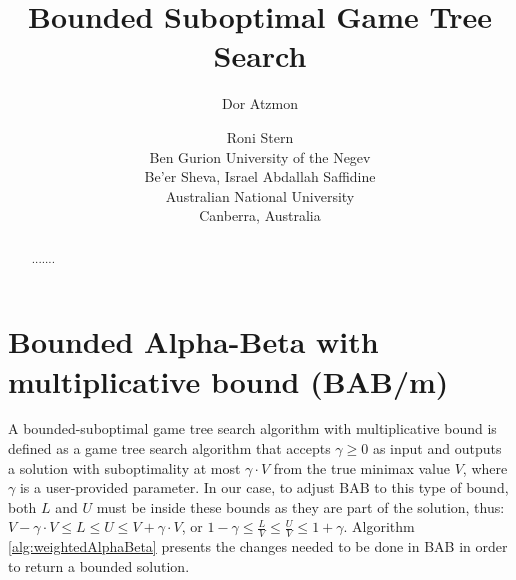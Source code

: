 \documentclass[letterpaper]{article} %
\newcounter{bab}
\newcommand{\MM}{\mathit{V}}
\newcommand{\pess}{\mathit{L}}
\newcommand{\opti}{\mathit{U}}
\begin{document}
\title{Bounded Suboptimal Game Tree Search}
\author{Dor Atzmon \and Roni Stern\\
Ben Gurion University of the Negev\\
Be'er Sheva, Israel
\And
Abdallah Saffidine \\
Australian National University\\
Canberra, Australia}

\maketitle

\begin{abstract}
.......
\end{abstract}



\section{Bounded Alpha-Beta with multiplicative bound (BAB/m)}

A bounded-suboptimal game tree search algorithm with multiplicative bound is defined as a game tree search algorithm that accepts $\gamma \geq 0$ as input and outputs a solution with suboptimality at most $\gamma \cdot \MM$ from the true minimax value $\MM$, where $\gamma$ is a user-provided parameter. In our case, to adjust BAB to this type of bound, both $\pess$ and $\opti$ must be inside these bounds as they are part of the solution, thus: $\MM - \gamma \cdot \MM \leq \pess \leq \opti \leq \MM + \gamma \cdot \MM$, or $1 - \gamma \leq \frac{\pess}{\MM} \leq \frac{\opti}{\MM} \leq 1 + \gamma$.
Algorithm \ref{alg:weightedAlphaBeta} presents the changes needed to be done in BAB in order to return a bounded solution.


 \label{sec:bab}
\end{document}
